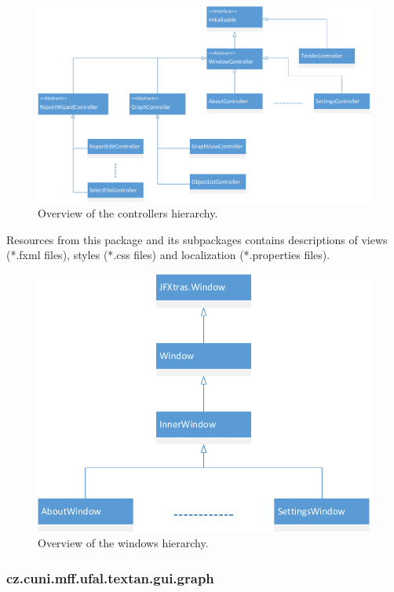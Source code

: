 \begin{figure}[!htb]
        \centering
        \includegraphics[width=\textwidth]{Images/Controllers}
        \caption{Overview of the controllers hierarchy.}
        \label{fig:Controllers}
\end{figure}

Resources from this package and its subpackages contains descriptions of views
(*.fxml files), styles (*.css files) and localization (*.properties files).

\begin{figure}[!htb]
        \centering
        \includegraphics[width=\textwidth]{Images/Windows}
        \caption{Overview of the windows hierarchy.}
        \label{fig:Windows}
\end{figure}

\subsubsection{cz.cuni.mff.ufal.textan.gui.graph}

